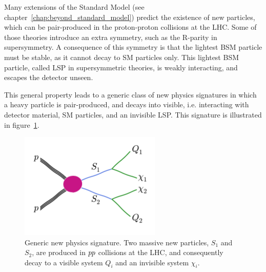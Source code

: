 

Many extensions of the Standard Model (see chapter~\ref{chap:beyond_standard_model}) predict the 
existence of new particles, which can be pair-produced in the proton-proton collisions at the LHC. 
Some of those theories introduce an extra symmetry, such as the R-parity in supersymmetry. A
consequence of this symmetry is that the lightest BSM particle must be stable, as it cannot decay
to SM particles only. This lightest BSM particle, called LSP in supersymmetric theories, is weakly
interacting, and escapes the detector unseen. 

This general property leads to a generic class of new physics signatures in which a heavy
particle is pair-produced, and decays into visible, i.e. interacting with detector material, SM
particles, and an invisible LSP. This signature is illustrated in figure~\ref{fig:razor_signature}.

\begin{figure}[htb]
  \centering
  \includegraphics[width=0.6\textwidth,clip=true,trim=0 1.8cm 0
0.8cm]{figures/razor_variables/signature} 
  \caption{Generic new physics signature. Two massive new particles, $S_1$ and $S_2$, are produced
in ${p}{p}$ collisions at the LHC, and consequently decay to a visible system $Q_i$ and an invisible
system $\chi_i$. \label{fig:razor_signature}}
\end{figure}

